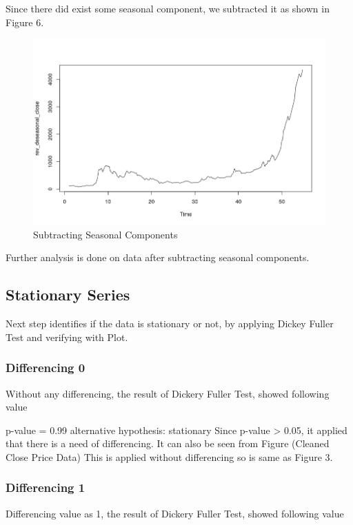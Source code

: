 \documentclass{article}
\begin{document}
Since there did exist some seasonal component, we subtracted it as shown in Figure 6.


\begin{figure}[ht]
	\centering
	\includegraphics[scale=0.25]{images/ts_images/SubtractingSeasonal.png}
	\caption{Subtracting Seasonal Components}
	\label{fig:Subtracting Seasonal Components}
\end{figure}

Further analysis is done on data after subtracting seasonal components.

\subsection{Stationary Series}

Next step identifies if the data is stationary or not, by applying Dickey Fuller Test and verifying with Plot.
\subsubsection{Differencing 0}
Without any differencing, the result of Dickery Fuller Test, showed following value

p-value = 0.99 \linebreak
alternative hypothesis: stationary \linebreak
Since p-value > 0.05, it applied that there is a need of differencing. It can also be seen from Figure (Cleaned Close Price Data)
This is applied without differencing so is same as Figure 3.

\subsubsection{Differencing 1}
Differencing value as 1, the result of Dickery Fuller Test, showed following value
\end{document}
